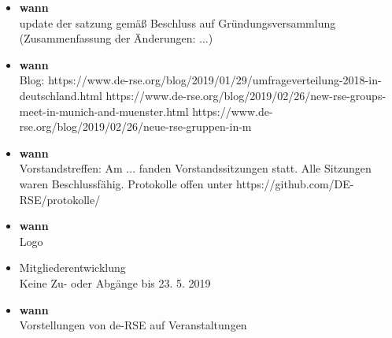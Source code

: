 \begin{itemize}
 \item \textbf{wann}\\
  update der satzung gemäß Beschluss auf Gründungsversammlung (Zusammenfassung der Änderungen: ...)
 \item \textbf{wann}\\
  Blog:
  https://www.de-rse.org/blog/2019/01/29/umfrageverteilung-2018-in-deutschland.html
  https://www.de-rse.org/blog/2019/02/26/new-rse-groups-meet-in-munich-and-muenster.html
  https://www.de-rse.org/blog/2019/02/26/neue-rse-gruppen-in-m%
 \item \textbf{wann}\\
  Vorstandstreffen: Am ... fanden Vorstandssitzungen statt. Alle Sitzungen waren Beschlussfähig.
  Protokolle offen unter https://github.com/DE-RSE/protokolle/
 \item \textbf{wann}\\
  Logo
 \item Mitgliederentwicklung\\
  Keine Zu- oder Abgänge bis 23. 5. 2019
 \item \textbf{wann}\\
  Vorstellungen von de-RSE auf Veranstaltungen
\end{itemize}




